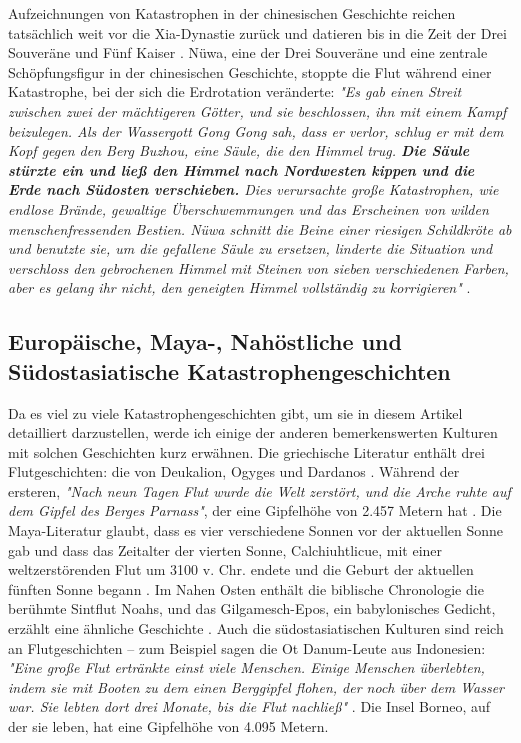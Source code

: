\documentclass[10pt,twocolumn,letterpaper]{article}
\begin{document}
Aufzeichnungen von Katastrophen in der chinesischen Geschichte reichen tatsächlich weit vor die Xia-Dynastie zurück und datieren bis in die Zeit der Drei Souveräne und Fünf Kaiser \cite{7}. Nüwa, eine der Drei Souveräne und eine zentrale Schöpfungsfigur in der chinesischen Geschichte, stoppte die Flut während einer Katastrophe, bei der sich die Erdrotation veränderte: \textit{"Es gab einen Streit zwischen zwei der mächtigeren Götter, und sie beschlossen, ihn mit einem Kampf beizulegen. Als der Wassergott Gong Gong sah, dass er verlor, schlug er mit dem Kopf gegen den Berg Buzhou, eine Säule, die den Himmel trug. \textbf{Die Säule stürzte ein und ließ den Himmel nach Nordwesten kippen und die Erde nach Südosten verschieben.} Dies verursachte große Katastrophen, wie endlose Brände, gewaltige Überschwemmungen und das Erscheinen von wilden menschenfressenden Bestien. Nüwa schnitt die Beine einer riesigen Schildkröte ab und benutzte sie, um die gefallene Säule zu ersetzen, linderte die Situation und verschloss den gebrochenen Himmel mit Steinen von sieben verschiedenen Farben, aber es gelang ihr nicht, den geneigten Himmel vollständig zu korrigieren"} \cite{8}.

\subsection{Europäische, Maya-, Nahöstliche und Südostasiatische Katastrophengeschichten}

Da es viel zu viele Katastrophengeschichten gibt, um sie in diesem Artikel detailliert darzustellen, werde ich einige der anderen bemerkenswerten Kulturen mit solchen Geschichten kurz erwähnen. Die griechische Literatur enthält drei Flutgeschichten: die von Deukalion, Ogyges und Dardanos \cite{9,10}. Während der ersteren, \textit{"Nach neun Tagen Flut wurde die Welt zerstört, und die Arche ruhte auf dem Gipfel des Berges Parnass"}, der eine Gipfelhöhe von 2.457 Metern hat \cite{11}. Die Maya-Literatur glaubt, dass es vier verschiedene Sonnen vor der aktuellen Sonne gab und dass das Zeitalter der vierten Sonne, Calchiuhtlicue, mit einer weltzerstörenden Flut um 3100 v. Chr. endete und die Geburt der aktuellen fünften Sonne begann \cite{12}. Im Nahen Osten enthält die biblische Chronologie die berühmte Sintflut Noahs, und das Gilgamesch-Epos, ein babylonisches Gedicht, erzählt eine ähnliche Geschichte \cite{13}. Auch die südostasiatischen Kulturen sind reich an Flutgeschichten – zum Beispiel sagen die Ot Danum-Leute aus Indonesien: \textit{"Eine große Flut ertränkte einst viele Menschen. Einige Menschen überlebten, indem sie mit Booten zu dem einen Berggipfel flohen, der noch über dem Wasser war. Sie lebten dort drei Monate, bis die Flut nachließ"} \cite{3}. Die Insel Borneo, auf der sie leben, hat eine Gipfelhöhe von 4.095 Metern.
\end{document}
